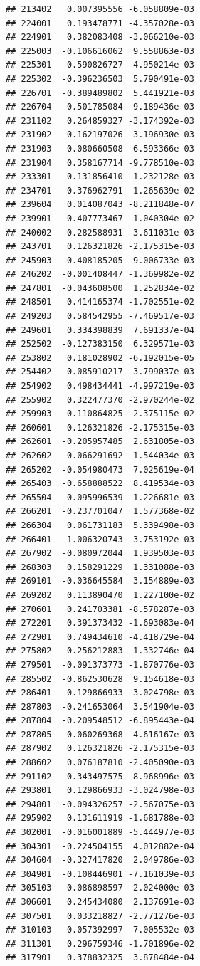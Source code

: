 \begin{frame}[fragile]
\begin{verbatim}
## 213402   0.007395556 -6.058809e-03
## 224001   0.193478771 -4.357028e-03
## 224901   0.382083408 -3.066210e-03
## 225003  -0.106616062  9.558863e-03
## 225301  -0.590826727 -4.950214e-03
## 225302  -0.396236503  5.790491e-03
## 226701  -0.389489802  5.441921e-03
## 226704  -0.501785084 -9.189436e-03
## 231102   0.264859327 -3.174392e-03
## 231902   0.162197026  3.196930e-03
## 231903  -0.080660508 -6.593366e-03
## 231904   0.358167714 -9.778510e-03
## 233301   0.131856410 -1.232128e-03
## 234701  -0.376962791  1.265639e-02
## 239604   0.014087043 -8.211848e-07
## 239901   0.407773467 -1.040304e-02
## 240002   0.282588931 -3.611031e-03
## 243701   0.126321826 -2.175315e-03
## 245903   0.408185205  9.006733e-03
## 246202  -0.001408447 -1.369982e-02
## 247801  -0.043608500  1.252834e-02
## 248501   0.414165374 -1.702551e-02
## 249203   0.584542955 -7.469517e-03
## 249601   0.334398839  7.691337e-04
## 252502  -0.127383150  6.329571e-03
## 253802   0.181028902 -6.192015e-05
## 254402   0.085910217 -3.799037e-03
## 254902   0.498434441 -4.997219e-03
## 255902   0.322477370 -2.970244e-02
## 259903  -0.110864825 -2.375115e-02
## 260601   0.126321826 -2.175315e-03
## 262601  -0.205957485  2.631805e-03
## 262602  -0.066291692  1.544034e-03
## 265202  -0.054980473  7.025619e-04
## 265403  -0.658888522  8.419534e-03
## 265504   0.095996539 -1.226681e-03
## 266201  -0.237701047  1.577368e-02
## 266304   0.061731183  5.339498e-03
## 266401  -1.006320743  3.753192e-03
## 267902  -0.080972044  1.939503e-03
## 268303   0.158291229  1.331088e-03
## 269101  -0.036645584  3.154889e-03
## 269202   0.113890470  1.227100e-02
## 270601   0.241703381 -8.578287e-03
## 272201   0.391373432 -1.693083e-04
## 272901   0.749434610 -4.418729e-04
## 275802   0.256212883  1.332746e-04
## 279501  -0.091373773 -1.870776e-03
## 285502  -0.862530628  9.154618e-03
## 286401   0.129866933 -3.024798e-03
## 287803  -0.241653064  3.541904e-03
## 287804  -0.209548512 -6.895443e-04
## 287805  -0.060269368 -4.616167e-03
## 287902   0.126321826 -2.175315e-03
## 288602   0.076187810 -2.405090e-03
## 291102   0.343497575 -8.968996e-03
## 293801   0.129866933 -3.024798e-03
## 294801  -0.094326257 -2.567075e-03
## 295902   0.131611919 -1.681788e-03
## 302001  -0.016001889 -5.444977e-03
## 304301  -0.224504155  4.012882e-04
## 304604  -0.327417820  2.049786e-03
## 304901  -0.108446901 -7.161039e-03
## 305103   0.086898597 -2.024000e-03
## 306601   0.245434080  2.137691e-03
## 307501   0.033218827 -2.771276e-03
## 310103  -0.057392997 -7.005532e-03
## 311301   0.296759346 -1.701896e-02
## 317901   0.378832325  3.878484e-04

\end{verbatim}
\end{frame}

